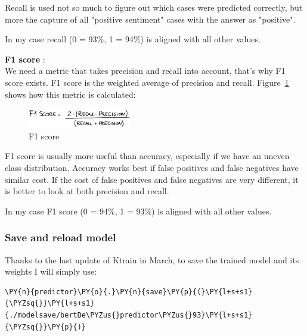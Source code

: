 Recall is used not so much to figure out which cases were predicted correctly, but more the capture of all "positive sentiment" cases with the answer as "positive".

In my case \gls{recall} (0 = 93\%, 1 = 94\%) is aligned with all other values.

\textbf{F1 score} \cite{brownlee_how_2020}:\\
We need a metric that takes \gls{precision} and \gls{recall} into account, that's why \gls{F1 score} exists.
\gls{F1 score} is the weighted average of \gls{precision} and \gls{recall}.
Figure~\ref{fig:fig_f1} shows how this metric is calculated:
\begin{figure}[ht!]
\centering
\includegraphics[width=0.4\textwidth]{images/f1.png}
\caption{\gls{F1 score}}
\label{fig:fig_f1}
\end{figure}
\FloatBarrier

\gls{F1 score} is usually more useful than \gls{accuracy}, especially if we have an uneven class distribution. Accuracy works best if false positives and false negatives have similar cost. If the cost of false positives and false negatives are very different, it is better to look at both \gls{precision} and \gls{recall}.

In my case \gls{F1 score} (0 = 94\%, 1 = 93\%) is aligned with all other values.


\subsubsection{Save and reload model}
Thanks to the last update of \gls{Ktrain} in March, to save the trained model and its weights I will simply use:
    \begin{tcolorbox}[breakable, size=fbox, boxrule=1pt, pad at break*=1mm,colback=cellbackground, colframe=cellborder]
\begin{Verbatim}[commandchars=\\\{\},fontsize=\footnotesize]
\PY{n}{predictor}\PY{o}{.}\PY{n}{save}\PY{p}{(}\PY{l+s+s1}{\PYZsq{}}\PY{l+s+s1}{./modelsave/bertDe\PYZus{}predictor\PYZus{}93}\PY{l+s+s1}{\PYZsq{}}\PY{p}{)}
\end{Verbatim}
\end{tcolorbox}


